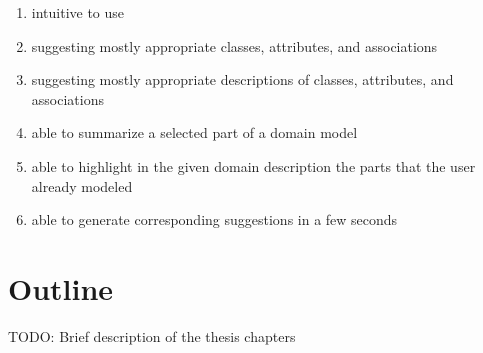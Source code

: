 \begin{enumerate}
\item intuitive to use
\item suggesting mostly appropriate classes, attributes, and associations
\item suggesting mostly appropriate descriptions of classes, attributes, and associations
\item able to summarize a selected part of a domain model
\item able to highlight in the given domain description the parts that the user already modeled
\item able to generate corresponding suggestions in a few seconds
\end{enumerate}


\section*{Outline}

\noindent{}TODO: Brief description of the thesis chapters